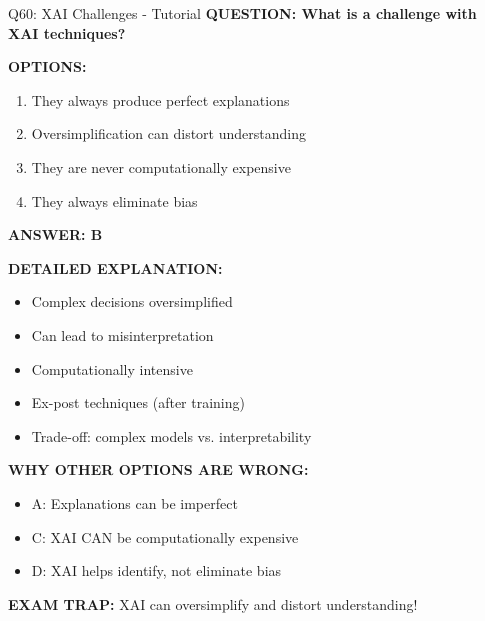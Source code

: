 \documentclass[8pt]{beamer}
\begin{document}
	\begin{frame}{Q60: XAI Challenges - Tutorial}
		\fontsize{6.5}{7.5}\selectfont
		\textbf{QUESTION: What is a challenge with XAI techniques?}
		
		\vspace{0.1cm}
		\textbf{OPTIONS:}
		\begin{enumerate}
			\item They always produce perfect explanations
			\item Oversimplification can distort understanding
			\item They are never computationally expensive
			\item They always eliminate bias
		\end{enumerate}
		
		\vspace{0.1cm}
		\textcolor{myblue}{\textbf{ANSWER: B}}
		
		\vspace{0.1cm}
		\textbf{DETAILED EXPLANATION:}
		\begin{itemize}
			\item Complex decisions oversimplified
			\item Can lead to misinterpretation
			\item Computationally intensive
			\item Ex-post techniques (after training)
			\item Trade-off: complex models vs. interpretability
		\end{itemize}
		
		\vspace{0.1cm}
		\textcolor{myred}{\textbf{WHY OTHER OPTIONS ARE WRONG:}}
		\begin{itemize}
			\item \textcolor{myred}{A:} Explanations can be imperfect
			\item \textcolor{myred}{C:} XAI CAN be computationally expensive
			\item \textcolor{myred}{D:} XAI helps identify, not eliminate bias
		\end{itemize}
		
		\textcolor{myred}{\textbf{EXAM TRAP:}} XAI can \textcolor{myblue}{oversimplify and distort understanding}!
	\end{frame}
	
\end{document}
